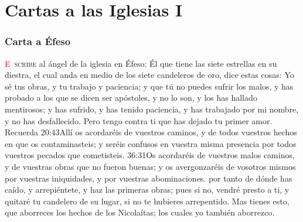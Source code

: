 \chapter{Cartas a las Iglesias I}
\subsection*{Carta a Éfeso}
\lettrine[lines=3]{\textcolor{red}{E}}{\ scribe} al ángel de la iglesia en Éfeso: 
\zz Él que tiene las siete estrellas en su diestra, el cual anda en medio de los siete candeleros de oro, dice estas cosas:%
Yo sé tus obras, y tu trabajo y paciencia; y que tú no puedes sufrir los malos, y has probado a los que se dicen ser apóstoles, y no lo son, y los has hallado mentirosos; %
y has sufrido, y has tenido paciencia, y has trabajado por mi nombre, y no has desfallecido. %
Pero tengo contra ti que has dejado tu primer amor.%
Recuerda%
				{20:43}{Allí os acordaréis de vuestros caminos, y de todos vuestros hechos en que os contaminasteis; y seréis confusos en vuestra misma presencia por todos vuestros pecados que cometisteis.}%
				{36:31}{Os acordaréis de vuestros malos caminos, y de vuestras obras que no fueron buenas; y os avergonzaréis de vosotros mismos por vuestras iniquidades, y por vuestras abominaciones.} %
por tanto de dónde has caído, y arrepiéntete, y haz las primeras obras; pues si no, vendré presto a ti, y quitaré tu candelero de su lugar, si no te hubieres arrepentido. %
Mas tienes esto, que aborreces los hechos de los Nicolaítas; los cuales yo también aborrezco.%
